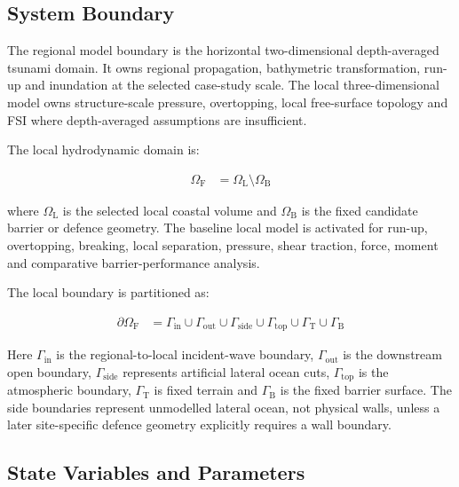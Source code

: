\subsection{System Boundary}
\label{sec:res-mod-sys-system-boundary}

The regional model boundary is the horizontal two-dimensional
depth-averaged tsunami domain. It owns regional propagation,
bathymetric transformation, run-up and inundation at the selected
case-study scale. The local three-dimensional model owns
structure-scale pressure, overtopping, local free-surface topology and
FSI where depth-averaged assumptions are insufficient.

The local hydrodynamic domain is:

\begin{align}
  \Omega_{\mathrm{F}}
  &=
  \Omega_{\mathrm{L}}
  \setminus
  \Omega_{\mathrm{B}}
  \label{eq:res-mod-sys-local-fluid-domain}
\end{align}

where $\Omega_{\mathrm{L}}$ is the selected local coastal volume and
$\Omega_{\mathrm{B}}$ is the fixed candidate barrier or defence
geometry. The baseline local model is activated for run-up,
overtopping, breaking, local separation, pressure, shear traction,
force, moment and comparative barrier-performance analysis.

The local boundary is partitioned as:

\begin{align}
  \partial\Omega_{\mathrm{F}}
  &=
  \Gamma_{\mathrm{in}}
  \cup
  \Gamma_{\mathrm{out}}
  \cup
  \Gamma_{\mathrm{side}}
  \cup
  \Gamma_{\mathrm{top}}
  \cup
  \Gamma_{\mathrm{T}}
  \cup
  \Gamma_{\mathrm{B}}
  \label{eq:res-mod-sys-local-boundary-partition}
\end{align}

Here $\Gamma_{\mathrm{in}}$ is the regional-to-local incident-wave
boundary, $\Gamma_{\mathrm{out}}$ is the downstream open boundary,
$\Gamma_{\mathrm{side}}$ represents artificial lateral ocean cuts,
$\Gamma_{\mathrm{top}}$ is the atmospheric boundary,
$\Gamma_{\mathrm{T}}$ is fixed terrain and $\Gamma_{\mathrm{B}}$ is
the fixed barrier surface. The side boundaries represent unmodelled
lateral ocean, not physical walls, unless a later site-specific defence
geometry explicitly requires a wall boundary.

\subsection{State Variables and Parameters}
\label{sec:res-mod-sys-state-variables-parameters}

